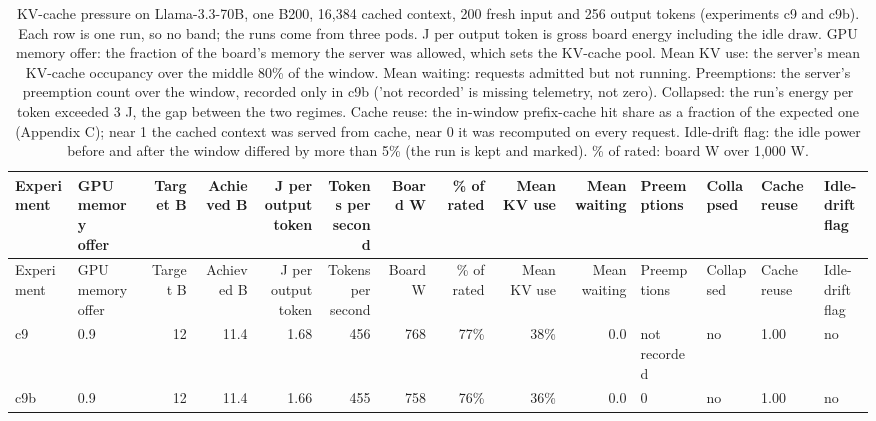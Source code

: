 \begin{landscape}
\begingroup
\scriptsize
\setlength{\tabcolsep}{3pt}
\begin{longtable}{llrrrrrrrrllll}
\caption{KV-cache pressure on Llama-3.3-70B, one B200, 16,384 cached context, 200 fresh input and 256 output tokens (experiments c9 and c9b). Each row is one run, so no band; the runs come from three pods. J per output token is gross board energy including the idle draw. GPU memory offer: the fraction of the board's memory the server was allowed, which sets the KV-cache pool. Mean KV use: the server's mean KV-cache occupancy over the middle 80\% of the window. Mean waiting: requests admitted but not running. Preemptions: the server's preemption count over the window, recorded only in c9b ('not recorded' is missing telemetry, not zero). Collapsed: the run's energy per token exceeded 3 J, the gap between the two regimes. Cache reuse: the in-window prefix-cache hit share as a fraction of the expected one (Appendix C); near 1 the cached context was served from cache, near 0 it was recomputed on every request. Idle-drift flag: the idle power before and after the window differed by more than 5\% (the run is kept and marked). \% of rated: board W over 1,000 W.}\label{tab:kv}\\
\toprule
Experiment & \makecell[l]{GPU memory\\offer} & Target B & Achieved B & \makecell[r]{J per output\\token} & \makecell[r]{Tokens per\\second} & Board W & \% of rated & Mean KV use & Mean waiting & Preemptions & Collapsed & Cache reuse & \makecell[l]{Idle-drift\\flag} \\
\midrule
\endfirsthead
\toprule
Experiment & \makecell[l]{GPU memory\\offer} & Target B & Achieved B & \makecell[r]{J per output\\token} & \makecell[r]{Tokens per\\second} & Board W & \% of rated & Mean KV use & Mean waiting & Preemptions & Collapsed & Cache reuse & \makecell[l]{Idle-drift\\flag} \\
\midrule
\endhead
\bottomrule
\endfoot
c9 & 0.9 & 12 & 11.4 & 1.68 & 456 & 768 & 77\% & 38\% & 0.0 & not recorded & no & 1.00 & no \\
c9b & 0.9 & 12 & 11.4 & 1.66 & 455 & 758 & 76\% & 36\% & 0.0 & 0 & no & 1.00 & no \\

\end{longtable}
\end{landscape}

